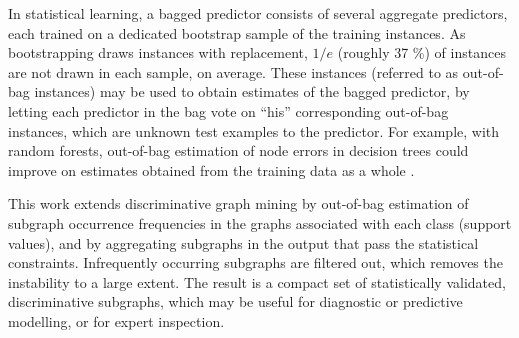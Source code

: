 \documentclass{sig-alternate}
\begin{document}

In statistical learning, a bagged predictor consists of several aggregate
predictors, each trained on a dedicated bootstrap sample of the training
instances. As bootstrapping draws instances with replacement, $1/e$ (roughly 37
\%) of instances are not drawn in each sample, on average. These instances
(referred to as out-of-bag instances) may be used to obtain estimates of the
bagged predictor, by letting each predictor in the bag vote on ``his'' corresponding 
out-of-bag instances, 
which are unknown test examples to the predictor.
For example, with random forests, out-of-bag estimation of node errors in
decision trees could improve on estimates obtained from the training data as a
whole \cite{breiman96oob}.

This work extends discriminative graph mining by out-of-bag estimation of 
subgraph occurrence frequencies in the graphs associated with each class (support values), 
and by aggregating subgraphs in the output that pass the
statistical constraints. Infrequently occurring subgraphs are filtered out, 
which removes the instability to a large extent. 
The result is a compact set of statistically validated,
discriminative subgraphs, which may be useful for diagnostic or predictive
modelling, or for expert inspection. 
\end{document}
